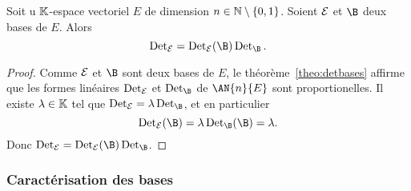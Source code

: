 \begin{prop}
  Soit u $\mathbb{K}$-espace vectoriel $E$ de dimension $n \in \mathbb{N}\setminus\{0,1\}$. Soient $\mathcal{E}$ et $\B$ deux bases de $E$. Alors
  \begin{equation}
    \Det_\E = \Det_\E(\B) \Det_\B.
  \end{equation}
\end{prop}
\begin{proof}
  Comme $\mathcal{E}$ et $\B$ sont deux bases de $E$, le théorème~\ref{theo:detbases} affirme que les formes linéaires $\operatorname{Det}_{\mathcal{E}}$ et $\Det_\B$ de $\AN{n}{E}$ sont proportionelles. Il existe $\lambda \in \mathbb{K}$ tel que $\Det_\E = \lambda \Det_\B$, et en particulier
  \begin{equation}
    \Det_\E(\B)= \lambda \Det_\B(\B) = \lambda.
  \end{equation}
  Donc $\Det_\E = \Det_\E(\B) \Det_\B$.
\end{proof}

\subsubsection{Caractérisation des bases}

